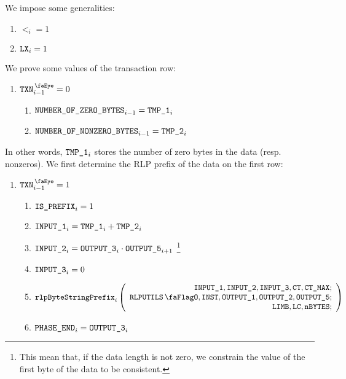 \begin{center}
\end{center}
We impose some generalities:
\begin{enumerate}
	\item $\lt_{i}=1$
	\item $\texttt{LX}_{i}=1$
\end{enumerate}
We prove some values of the transaction row:
\begin{enumerate}[resume]
	\item \If $\isTxn_{i-1}=0$ \Then
		\begin{enumerate}
			\item $\texttt{NUMBER\_OF\_ZERO\_BYTES}_{i-1}    = \texttt{TMP\_1}_{i}$
			\item $\texttt{NUMBER\_OF\_NONZERO\_BYTES}_{i-1} = \texttt{TMP\_2}_{i}$
		\end{enumerate}
\end{enumerate}
In other words, $\texttt{TMP\_1}_{i}$ stores the number of zero bytes in the data (resp. nonzeros). 
\newline
We first determine the RLP prefix of the data on the first row:
\begin{enumerate}[resume]
	\item \If $\isTxn_{i-1}=1$ \Then
		\begin{enumerate}
			\item $\texttt{IS\_PREFIX}_{i} = 1$
			\item $\texttt{INPUT\_1}_{i} = \texttt{TMP\_1}_{i} + \texttt{TMP\_2}_{i}$
			\item $\texttt{INPUT\_2}_{i} = \texttt{OUTPUT\_3}_{i} \cdot \texttt{OUTPUT\_5}_{i+1}$
				\footnote{This mean that, if the data length is not zero, we constrain the value of the first byte of the data to be consistent.}
			\item $\texttt{INPUT\_3}_{i} = 0$ 
			\item 
				\[
					\rlpBytestringPrefix_{i}
					\left(
					\begin{array}{r}
						\inputColumn{1},
						\inputColumn{2},
						\inputColumn{3},
						\ct,
						\maxCt; \\
						\rlpUtilsFlag,
						\INST,
						\resultColumn{1},
						\resultColumn{2},
						\resultColumn{5}; \\
						\limb,
						\lc,
						\limbsize; \\
					\end{array}
					\right)
				\]
			\item $\texttt{PHASE\_END}_{i} = \texttt{OUTPUT\_3}_{i}$
		\end{enumerate}
\end{enumerate}
